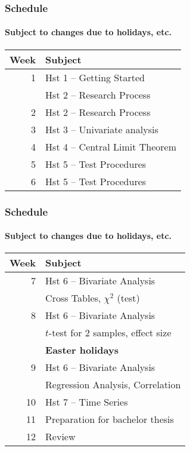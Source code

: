 \documentclass[aspectratio=169]{beamer}
\begin{document}
\begin{frame}
  \frametitle{Schedule}
  \framesubtitle{Subject to changes due to holidays, etc.}
  
  \centering
  \begin{tabular}{rl}
  	\toprule
  	\textbf{Week} & \textbf{Subject}                \\
  	\midrule
  	            1 & Hst 1 -- Getting Started        \\
  	              & Hst 2 -- Research Process       \\
  	            2 & Hst 2 -- Research Process       \\
  	            3 & Hst 3 -- Univariate analysis    \\
  	            4 & Hst 4 -- Central Limit Theorem  \\
  	            5 & Hst 5 -- Test Procedures        \\
  	            6 & Hst 5 -- Test Procedures        \\
  \end{tabular}
  
\end{frame}

\begin{frame}
  \frametitle{Schedule}
\framesubtitle{Subject to changes due to holidays, etc.}
  
  \centering
  \begin{tabular}{rl}
  	\toprule
  	\textbf{Week} & \textbf{Subject}                                    \\
  	\midrule
  	            7 & Hst 6 -- Bivariate Analysis                         \\
  	              & \hspace{1.25cm} Cross Tables, $\chi^2$ (test)       \\
  	            8 & Hst 6 -- Bivariate Analysis                         \\
  	              & \hspace{1.25cm} $t$-test for 2 samples, effect size \\
  	              & \textbf{Easter holidays}                            \\
  	            9 & Hst 6 -- Bivariate Analysis                         \\
  	              & \hspace{1.25cm} Regression Analysis, Correlation    \\
  	           10 & Hst 7 -- Time Series                                \\
  	           11 & Preparation for bachelor thesis                     \\
  	           12 & Review                                              \\
  \end{tabular}
  
\end{frame}
\end{document}
